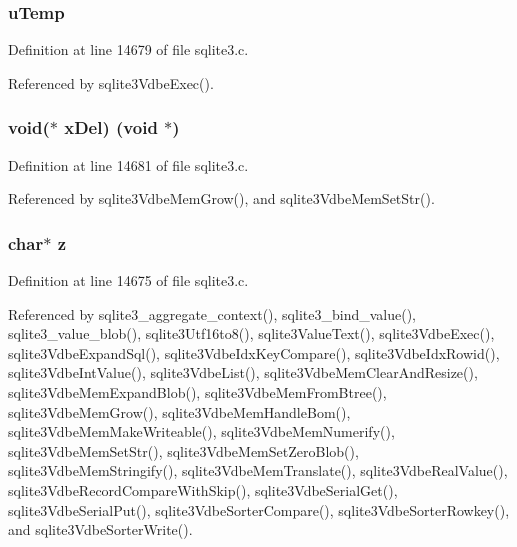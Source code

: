 \subsubsection[{u\+Temp}]{ u\+Temp}\label{struct_mem_a95b9bece3b8200fe5d56d20aa4c6ea94}


Definition at line 14679 of file sqlite3.\+c.



Referenced by sqlite3\+Vdbe\+Exec().

\hypertarget{struct_mem_ad2185e5192b0df27c6a55ba9b65c94c2}{}
\subsubsection[{x\+Del}]{\setlength{\rightskip}{0pt plus 5cm}void($\ast$ x\+Del) (void $\ast$)}\label{struct_mem_ad2185e5192b0df27c6a55ba9b65c94c2}


Definition at line 14681 of file sqlite3.\+c.



Referenced by sqlite3\+Vdbe\+Mem\+Grow(), and sqlite3\+Vdbe\+Mem\+Set\+Str().

\hypertarget{struct_mem_a99c0cc44b073a87d419d090571f773a5}{}
\subsubsection[{z}]{\setlength{\rightskip}{0pt plus 5cm}char$\ast$ z}\label{struct_mem_a99c0cc44b073a87d419d090571f773a5}


Definition at line 14675 of file sqlite3.\+c.



Referenced by sqlite3\+\_\+aggregate\+\_\+context(), sqlite3\+\_\+bind\+\_\+value(), sqlite3\+\_\+value\+\_\+blob(), sqlite3\+Utf16to8(), sqlite3\+Value\+Text(), sqlite3\+Vdbe\+Exec(), sqlite3\+Vdbe\+Expand\+Sql(), sqlite3\+Vdbe\+Idx\+Key\+Compare(), sqlite3\+Vdbe\+Idx\+Rowid(), sqlite3\+Vdbe\+Int\+Value(), sqlite3\+Vdbe\+List(), sqlite3\+Vdbe\+Mem\+Clear\+And\+Resize(), sqlite3\+Vdbe\+Mem\+Expand\+Blob(), sqlite3\+Vdbe\+Mem\+From\+Btree(), sqlite3\+Vdbe\+Mem\+Grow(), sqlite3\+Vdbe\+Mem\+Handle\+Bom(), sqlite3\+Vdbe\+Mem\+Make\+Writeable(), sqlite3\+Vdbe\+Mem\+Numerify(), sqlite3\+Vdbe\+Mem\+Set\+Str(), sqlite3\+Vdbe\+Mem\+Set\+Zero\+Blob(), sqlite3\+Vdbe\+Mem\+Stringify(), sqlite3\+Vdbe\+Mem\+Translate(), sqlite3\+Vdbe\+Real\+Value(), sqlite3\+Vdbe\+Record\+Compare\+With\+Skip(), sqlite3\+Vdbe\+Serial\+Get(), sqlite3\+Vdbe\+Serial\+Put(), sqlite3\+Vdbe\+Sorter\+Compare(), sqlite3\+Vdbe\+Sorter\+Rowkey(), and sqlite3\+Vdbe\+Sorter\+Write().

